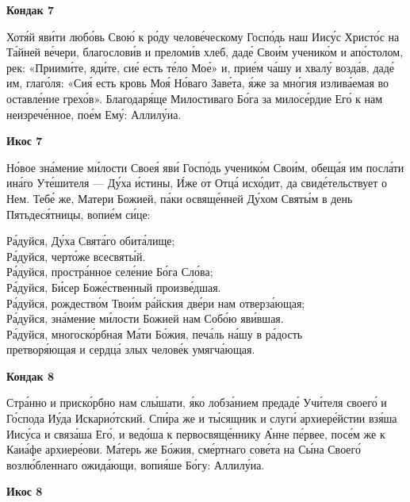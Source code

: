 \documentclass[14pt,article,oneside]{memoir}
\begin{document}
\begin{center}
  \textbf{Кондак 7}
\end{center}

Хотя́й яви́ти любо́вь Свою́ к ро́ду челове́ческому Госпо́дь наш Иису́с Христо́с на Та́йней ве́чери, благослови́в и преломи́в хлеб, даде́ Свои́м ученико́м и апо́столом, рек: «Приими́те, яди́те, сие́ есть те́ло Мое́» и, прие́м ча́шу и хвалу́ возда́в, даде́ им, глаго́ля: «Сия́ есть кровь Моя́ Но́ваго Заве́та, я́же за мно́гия излива́емая во оставле́ние грехо́в». Благодаря́ще Милостиваго Бо́га за милосе́рдие Его́ к нам неизрече́нное, пое́м Ему́: Аллилу́иа.

\begin{center}
  \textbf{Икос 7}
\end{center}

Но́вое зна́мение ми́лости Своея́ яви́ Госпо́дь ученико́м Свои́м, обеща́я им посла́ти ина́го Уте́шителя — Ду́ха и́стины, И́же от Отца́ исхо́дит, да свиде́тельствует о Нем. Тебе́ же, Матери Божией, па́ки освяще́нней Ду́хом Святы́м в день Пятьдеся́тницы, вопие́м си́це:

\noindent Ра́дуйся, Ду́ха Свята́го обита́лище;\\ Ра́дуйся, черто́же всесвяты́й.\\
Ра́дуйся, простра́нное селе́ние Бо́га Сло́ва;\\ Ра́дуйся, Би́сер Боже́ственный произве́дшая.\\
Ра́дуйся, рождество́м Твои́м ра́йския две́ри нам отверза́ющая;\\ Ра́дуйся, зна́мение ми́лости Божией нам Собо́ю яви́вшая.\\
Ра́дуйся, многоско́рбная Ма́ти Бо́жия, печа́ль на́шу в ра́дость\\ \vin претворя́ющая и сердца́ злых челове́к умягча́ющая.

\pagebreak

\begin{center}
  \textbf{Кондак 8}
\end{center}

Стра́нно и приско́рбно нам слы́шати, я́ко лобза́нием предаде́ Учи́теля своего́ и Го́спода Иу́да Искарио́тский. Спи́ра же и ты́сящник и слуги́ архиере́йстии взя́ша Иису́са и связа́ша Его́, и ведо́ша к первосвяще́ннику А́нне пе́рвее, посе́м же к Каиа́фе архиере́ови. Ма́терь же Бо́жия, сме́ртнаго сове́та на Сы́на Своего́ возлю́бленнаго ожида́ющи, вопия́ше Бо́гу: Аллилу́иа.

\begin{center}
  \textbf{Икос 8}
\end{center}
\end{document}
